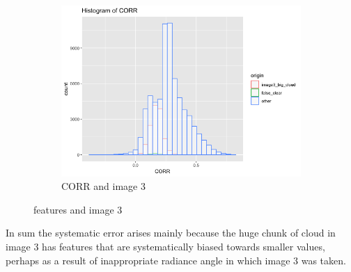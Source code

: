 \documentclass[jou]{apa}%
\begin{document}
\begin{figure}[H]
\begin{subfigure}{0.4\columnwidth}
    \includegraphics[scale=.2]{CORRfalseclear}
    \caption{CORR and image 3}
    \label{fig:2}
  \end{subfigure}
 \caption{features and image 3}
\end{figure}

\indent In sum the systematic error arises mainly because the huge chunk of cloud in image 3 has features that are systematically biased towards smaller values, perhaps as a result of inappropriate radiance angle in which image 3 was taken.
\end{document}
